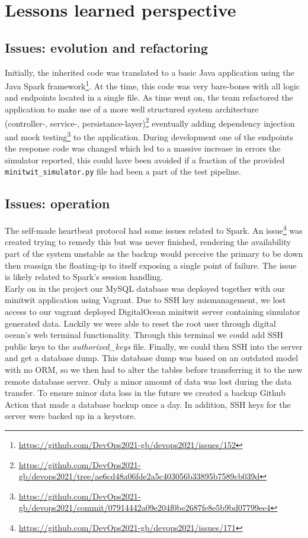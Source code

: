 \section{Lessons learned perspective} \label{section:Lessons learned perspective}
\subsection{Issues: evolution and refactoring}
Initially, the inherited code was translated to a basic Java application using the Java Spark framework\footnote{\url{https://github.com/DevOps2021-gb/devops2021/issues/152}}. At the time, this code was very bare-bones with all logic and endpoints located in a single file. As time went on, the team refactored the application to make use of a more well structured system architecture (controller-, service-, persistance-layer)\footnote{\url{https://github.com/DevOps2021-gb/devops2021/tree/ae6cd48a06fde2a5c403056b33895b7589cb039d}} eventually adding dependency injection and mock testing\footnote{\url{https://github.com/DevOps2021-gb/devops2021/commit/07914442a09e204f0be2687fe8e5b9bd07799ee4}} to the application. 
During development one of the endpoints the response code was changed which led to a massive increase in errors the simulator reported, this could have been avoided if a fraction of the provided \texttt{minitwit\_simulator.py} file had been a part of the test pipeline.

\subsection{Issues: operation}
\label{issues-operation}
The self-made heartbeat protocol had some issues related to Spark. An issue\footnote{\url{https://github.com/DevOps2021-gb/devops2021/issues/171}} was created trying to remedy this but was never finished, rendering the availability part of the system unstable as the backup would perceive the primary to be down then reassign the floating-ip to itself exposing a single point of failure. The issue is likely related to Spark's session handling.\\

Early on in the project our MySQL database was deployed together with our minitwit application using Vagrant. Due to SSH key mismanagement, we lost access to our vagrant deployed DigitalOcean minitwit server containing simulator generated data. Luckily we were able to reset the root user through digital ocean's web terminal functionality. Through this terminal we could add SSH public keys to the \textit{authorized\_keys} file. Finally, we could then SSH into the server and get a database dump. This database dump was based on an outdated model with no ORM, so we then had to alter the tables before transferring it to the new remote database server. Only a minor amount of data was lost during the data transfer. To ensure minor data loss in the future we created a backup Github Action that made a database backup once a day. In addition, SSH keys for the server were backed up in a keystore.\\

